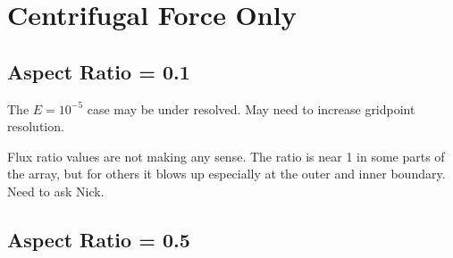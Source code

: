 \section{Centrifugal Force Only}

\subsection{Aspect Ratio = 0.1}

The $E=10^{-5}$ case may be under resolved. May need to increase gridpoint resolution. 

\keradius

\azavgtemperature

\azavgomega
 
\azavgmassflux

\fluxpol

\fluxeq

\condfluxrin

\condfluxrout

\clearpage

Flux ratio values are not making any sense. The ratio is near 1 in some parts of the array, but for others it blows up especially at the outer and inner boundary. Need to ask Nick.

\ekfixtable

\clearpage

\subsection{Aspect Ratio = 0.5}


\keradiusarfive

\azavgtemperaturearfive

\azavgomegaarfive

\azavgmassfluxarfive

\condfluxrinarbig

\condfluxroutarbig

\centrifugaltablearfive

\clearpage
